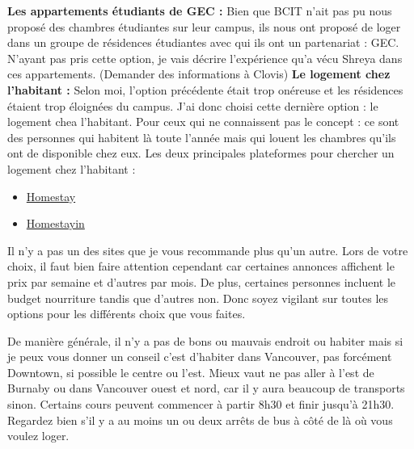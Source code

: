 \documentclass{article}
\begin{document}
\noindent\textbf{Les appartements étudiants de GEC :}\newline
Bien que BCIT n'ait pas pu nous proposé des chambres étudiantes sur leur campus, ils nous ont proposé de loger dans un groupe de résidences étudiantes avec qui ils ont un partenariat : GEC. N'ayant pas pris cette option, je vais décrire l'expérience qu'a vécu Shreya dans ces appartements.\newline
(Demander des informations à Clovis)\newline\newline
\noindent\textbf{Le logement chez l'habitant :}\newline
Selon moi, l'option précédente était trop onéreuse et les résidences étaient trop éloignées du campus. J'ai donc choisi cette dernière option : le logement chea l'habitant. Pour ceux qui ne connaissent pas le concept : ce sont des personnes qui habitent là toute l'année mais qui louent les chambres qu'ils ont de disponible chez eux. Les deux principales plateformes pour chercher un logement chez l'habitant :
\begin{itemize}
    \item \href{https://www.homestay.com/fr}{Homestay}
    \item \href{https://www.homstayin.com/fr}{Homestayin}
\end{itemize}
Il n'y a pas un des sites que je vous recommande plus qu'un autre. Lors de votre choix, il faut bien faire attention cependant car certaines annonces affichent le prix par semaine et d'autres par mois. De plus, certaines personnes incluent le budget nourriture tandis que d'autres non. Donc soyez vigilant sur toutes les options pour les différents choix que vous faites.\newline\newline\newline

De manière générale, il n'y a pas de bons ou mauvais endroit ou habiter mais si je peux vous donner un conseil c'est d'habiter dans Vancouver, pas forcément Downtown, si possible le centre ou l'est. Mieux vaut ne pas aller à l'est de Burnaby ou dans Vancouver ouest et nord, car il y aura beaucoup de transports sinon. Certains cours peuvent commencer à partir 8h30 et finir jusqu'à 21h30. Regardez bien s'il y a au moins un ou deux arrêts de bus à côté de là où vous voulez loger.
\end{document}
